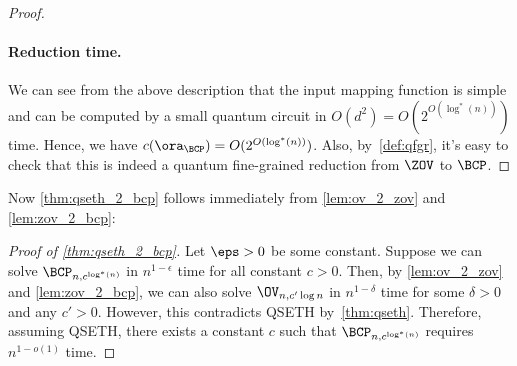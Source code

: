 \begin{proof}
\paragraph*{Reduction time.} We can see from the above description that the input mapping function is simple and can be computed by a small quantum circuit in $O(d^2)=O(2^{O(\log^* (n))})$ time. Hence, we have $c(\ora_{\BCP})=O(2^{O(\log^* (n))})$. Also, by~\cref{def:qfgr}, it's easy to check that this is indeed a quantum fine-grained reduction from $\ZOV$ to $\BCP$.
\end{proof}

Now \cref{thm:qseth_2_bcp} follows immediately from \cref{lem:ov_2_zov} and \cref{lem:zov_2_bcp}:
\begin{proof}[Proof of \cref{thm:qseth_2_bcp}]
Let $\eps > 0$ be some constant. Suppose we can solve $\BCP_{n,c^{\log^* (n)}}$ in $n^{1-\epsilon}$ time for all constant $c>0$. Then, by \cref{lem:ov_2_zov} and \cref{lem:zov_2_bcp}, we can also solve $\OV_{n,c'\log n}$ in $n^{1-\delta}$ time for some $\delta > 0$ and any $c'>0$. However, this contradicts QSETH by~\cref{thm:qseth}. Therefore, assuming QSETH, there exists a constant $c$ such that $\BCP_{n,c^{\log^*( n)}}$ requires $n^{1-o(1)}$ time.
\end{proof}
